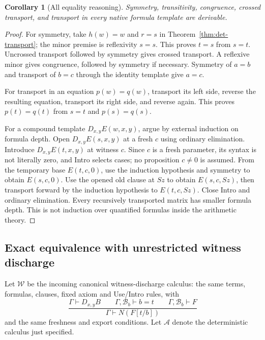 \documentclass[11pt,a4paper]{article}
\newtheorem{corollary}[theorem]{Corollary}
\theoremstyle{definition}\newtheorem{definition}[theorem]{Definition}
\theoremstyle{remark}\newtheorem{remark}[theorem]{Remark}
\begin{document}
\begin{corollary}[All equality reasoning]
\label{cor:det-equality}
Symmetry, transitivity, congruence, crossed transport, and transport in
every native formula template are derivable.
\end{corollary}
\begin{proof}
For symmetry, take $h(w)=w$ and $r=s$ in
Theorem~\ref{thm:det-transport}; the minor premise is reflexivity $s=s$.
This proves $t=s$ from $s=t$. Uncrossed transport followed by symmetry
gives crossed transport. A reflexive minor gives congruence, followed by
symmetry if necessary. Symmetry of $a=b$ and transport of $b=c$ through
the identity template give $a=c$.

For transport in an equation $p(w)=q(w)$, transport its left side,
reverse the resulting equation, transport its right side, and reverse
again. This proves $p(t)=q(t)$ from $s=t$ and $p(s)=q(s)$.

For a compound template $D_{x,y}E(w,x,y)$, argue by external induction
on formula depth. Open $D_{x,y}E(s,x,y)$ at a fresh $c$ using ordinary
elimination. Introduce $D_{x,y}E(t,x,y)$ at witness $c$. Since $c$ is
a fresh parameter, its syntax is not literally zero, and Intro selects
cases; no proposition $c\ne0$ is assumed. From the temporary base
$E(t,c,0)$, use the induction hypothesis and symmetry to obtain
$E(s,c,0)$. Use the opened old clause at $Sz$ to obtain $E(s,c,Sz)$,
then transport forward by the induction hypothesis to $E(t,c,Sz)$.
Close Intro and ordinary elimination. Every recursively transported
matrix has smaller formula depth. This is not induction over quantified
formulas inside the arithmetic theory.
\end{proof}

\subsection{Exact equivalence with unrestricted witness discharge}

Let $\mathcal W$ be the incoming canonical witness-discharge calculus:
the same terms, formulas, clauses, fixed axiom and Use/Intro rules, with
\[
 \frac{\Gamma\vdash D_{x,y}B\qquad
       \Gamma,\mathcal B_b\vdash b=t\qquad
       \Gamma,\mathcal B_b\vdash F}
      {\Gamma\vdash N(F[t/b])}
 \tag{Old Name}
\]
and the same freshness and export conditions. Let $\mathcal A$ denote
the deterministic calculus just specified.
\end{document}

